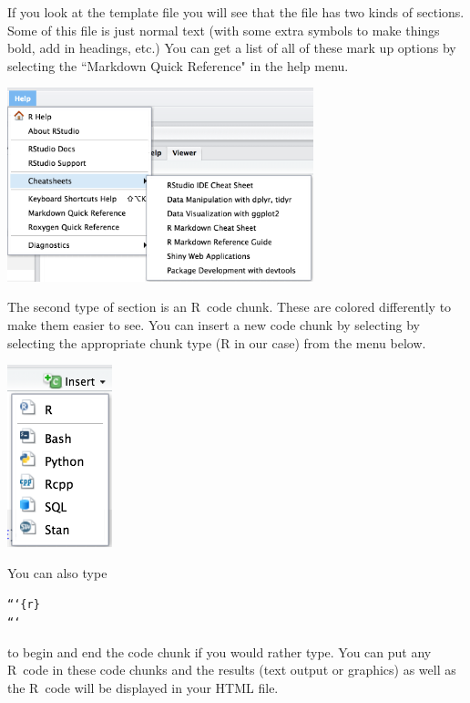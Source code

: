 \documentclass[twoside]{book}\usepackage[]{graphicx}\usepackage[]{xcolor}
\makeatletter
\newenvironment{kframe}{%
 \def\at@end@of@kframe{}%
 \ifinner\ifhmode%
  \def\at@end@of@kframe{\end{minipage}}%
  \begin{minipage}{\columnwidth}%
 \fi\fi%
 \def\FrameCommand##1{\hskip\@totalleftmargin \hskip-\fboxsep
 \colorbox{shadecolor}{##1}\hskip-\fboxsep
     \hskip-\linewidth \hskip-\@totalleftmargin \hskip\columnwidth}%
 \MakeFramed {\advance\hsize-\width
   \@totalleftmargin\z@ \linewidth\hsize
   \@setminipage}}%
 {\par\unskip\endMakeFramed%
 \at@end@of@kframe}
\newenvironment{knitrout}{}{} %
\def\R{{\sf R}}
\makeatother
\begin{document}
If you look at the template file you will see that the file has two kinds of
sections.  Some of this file is just normal text (with some extra symbols to
make things bold, add in headings, etc.)  You can get a list of all of these
mark up options by selecting the ``Markdown Quick Reference" in the help
menu.

\begin{center}
	\includegraphics[width = 3.5in]{images/MarkdownQuickReference.png}
\end{center}

The second type of section is an \R\ code chunk.  These are colored differently to make them
easier to see.  You can insert a new code chunk by selecting by selecting
the appropriate chunk type (R in our case) from the menu below.
\begin{center}
	\includegraphics[width = 1.2in]{images/InsertChunk.png}
\end{center}

\noindent
You can also type 
\begin{knitrout}
\color{fgcolor}\begin{kframe}
\begin{alltt}
```\{r\}
```
\end{alltt}
\end{kframe}
\end{knitrout}
to begin and end the code chunk if you would rather type.
You can put any \R\ code in these code chunks and the results (text output or graphics) as well
as the \R\ code will be displayed in your HTML file.
\end{document}
